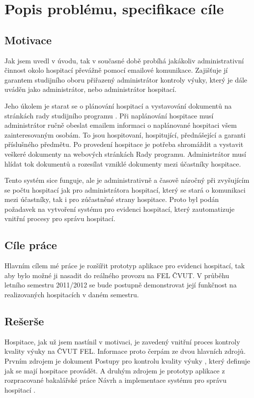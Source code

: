 \chapter{Popis problému, specifikace cíle}
\section{Motivace}
Jak jsem uvedl v úvodu, tak v současné době probíhá jakákoliv administrativní činnost okolo hospitací převážně pomocí emailové komunikace. Zajišťuje jí garantem studijního oboru přiřazený administrátor kontroly výuky, který je dále  uváděn jako administrátor, nebo administrátor hospitací. 

Jeho úkolem je starat se o plánování hospitací a vystavování dokumentů na stránkách rady studijního programu \cite{kvalitavyukyweb}. Při naplánování hospitace musí administrátor ručně obeslat emailem informaci o naplánované hospitaci všem zainteresovaným osobám. To jsou hospitovaní, hospitující, přednášející a garanti příslušného předmětu. Po provedení hospitace je potřeba shromáždit a vystavit veškeré dokumenty na webových stránkách Rady programu. Administrátor musí hlídat tok dokumentů a rozesílat vzniklé dokumenty mezi účastníky hospitace.

Tento systém sice funguje, ale je administrativně a časově náročný při zvyšujícím se počtu hospitací jak pro administrátora hospitací, který se stará o komunikaci mezi účastníky, tak i pro zúčastněné strany hospitace. Proto byl podán požadavek na vytvoření systému pro evidenci hospitací, který zautomatizuje vnitřní procesy pro správu hospitací.

\section{Cíle práce}
Hlavním cílem mé práce je rozšířit prototyp aplikace pro evidenci hospitací, tak aby bylo možné ji nasadit do reálného provozu na FEL ČVUT. V průběhu letního semestru 2011/2012 se bude postupně demonstrovat její funkčnost na realizovaných hospitacích v daném semestru.

\section{Rešerše}
Hospitace, jak už jsem nastínil v motivaci, je zavedený vnitřní proces kontroly kvality výuky na ČVUT FEL. Informace proto čerpám ze dvou hlavních zdrojů. Prvním zdrojem je dokument Postupy pro kontrolu kvality výuky \cite{postupy}, který definuje jak se mají hospitace provádět. A druhým zdrojem je prototyp aplikace z rozpracované bakalářské práce Návrh a implementace systému pro správu hospitací \cite{prototyp_documentace}.

